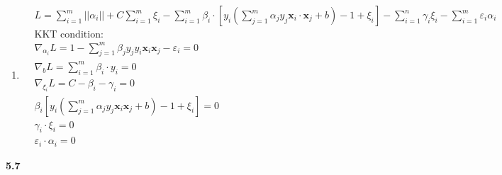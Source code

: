 \documentclass[12pt]{article}
\begin{document}
\begin{enumerate}[label=(\alph*), left=0pt]
    \item 
    \begin{align*}
        &L=\sum_{i=1}^{m}||\alpha_{i}||+C\sum_{i=1}^{m}\xi_{i}-\sum_{i=1}^{m}\beta_{i}\cdot[y_{i}(\sum_{j=1}^{m}\alpha_{j}y_{j}\textbf{x}_{i}\cdot \textbf{x}_{j}+b)-1+\xi_{i}]-\sum_{i=1}^{n}\gamma_{i}\xi_{i}-\sum_{i=1}^{m}\varepsilon_{i}\alpha_{i} \\
        &\text{KKT condition:} \\
        & \nabla_{\alpha_{i}}L=1 - \sum_{j=1}^{m}\beta_{j}y_{j}y_{i}\textbf{x}_{i}\textbf{x}_{j}-\varepsilon_{i}=0 \\
        &\nabla_{b}L=\sum_{i=1}^{m}\beta_{i}\cdot y_{i}=0 \\
        &\nabla_{\xi_{i}}L=C-\beta_{i}-\gamma_{i}=0 \\
        &\beta_{i}[y_{i}(\sum_{j=1}^{m}\alpha_{j}y_{j}\textbf{x}_{i}\textbf{x}_{j}+b)-1+\xi_{i}]=0 \\
        &\gamma_{i}\cdot\xi_{i}=0 \\
        &\varepsilon_{i}\cdot\alpha_{i}=0
    \end{align*}
\end{enumerate}


\vspace{1em}  %

\noindent \textbf{5.7}
\end{document}
